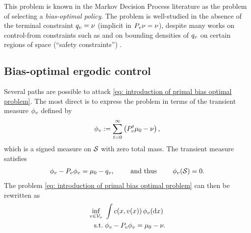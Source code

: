 \documentclass[twoside,10pt]{../jmlr}
\begin{document}
This problem is known in the Markov Decision Process literature as the problem of selecting a \emph{bias-optimal policy}. The problem is well-studied in the absence of the terminal constraint $q_v=\nu$ (implicit in $P_v\nu=\nu$), despite many works on control-from constraints such as \citet[][and references therein]{vazquez-abad_lp-based_2014,hernandez-lerma_constrained_2003} and on bounding densities of $q_v$ on certain regions of space (``safety constraints'') \citep{?}. 


\subsection{Bias-optimal ergodic control}

Several paths are possible to attack \eqref{eq: introduction of primal bias optimal problem}. The most direct is to express the problem in terms of the transient measure $\phi_v$ defined by
\begin{align}
    \phi_v:=\sum_{t=0}^{\infty}\left(P_v^t\mu_0-\nu\right),
    \label{eq: introduction of transient measure}
\end{align}
which is a signed measure on $\mathcal{S}$ with zero total mass. The transient measure satisfies
\begin{align}
    \phi_v-P_v\phi_v=\mu_0-q_v,
    \qquad\mbox{ and thus }\qquad \phi_v(\mathcal{S})=0. \label{eq: introduction of transient measure flow equation}
\end{align}
The problem \eqref{eq: introduction of primal bias optimal problem} can then be rewritten as
\begin{align}
    \inf_{v\in\mathcal{V}_\nu}\ & \int c(x,v(x))\,\phi_v(\mathrm{d} x) \label{eq: introduction of transient measure problem}\\
    \mbox{s.t.}\;& \phi_v-P_v\phi_v=\mu_0-\nu. \notag
\end{align}
\end{document}
